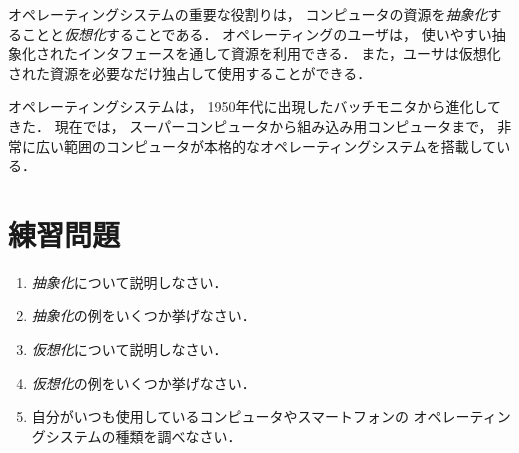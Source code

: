 オペレーティングシステムの重要な役割りは，
コンピュータの資源を\emph{抽象化}することと\emph{仮想化}することである．
オペレーティングのユーザは，
使いやすい抽象化されたインタフェースを通して資源を利用できる．
また，ユーサは仮想化された資源を必要なだけ独占して使用することができる．

オペレーティングシステムは，
1950年代に出現したバッチモニタから進化してきた．
現在では，
スーパーコンピュータから組み込み用コンピュータまで，
非常に広い範囲のコンピュータが本格的なオペレーティングシステムを搭載している．


\section*{練習問題}
\begin{enumerate}
  \renewcommand{\labelenumi}{\ttfamily\arabic{chapter}.\arabic{enumi}}
  \setlength{\leftskip}{1em}
\item \emph{抽象化}について説明しなさい．
\item \emph{抽象化}の例をいくつか挙げなさい．
\item \emph{仮想化}について説明しなさい．
\item \emph{仮想化}の例をいくつか挙げなさい．
\item 自分がいつも使用しているコンピュータやスマートフォンの
  オペレーティングシステムの種類を調べなさい．
\end{enumerate}
